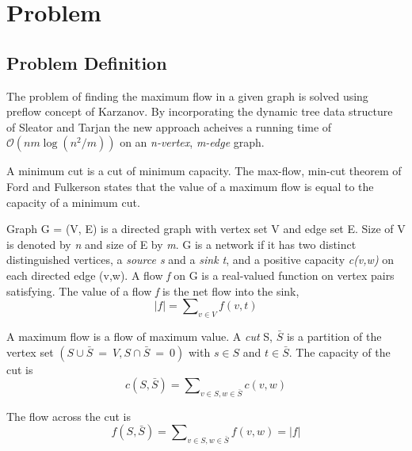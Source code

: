 \section*{Problem}

\subsection*{Problem Definition}
    The problem of finding the maximum flow in a given graph is solved using
    preflow concept of Karzanov. By incorporating the dynamic tree data
    structure~\cite{Sleator:1983:DSD:61337.61338} of Sleator and Tarjan 
    the new approach acheives a running time of $\mathcal{O}(nm\log{(n^2/m)})$ on an 
    \textit{n-vertex}, \textit{m-edge} graph. \newline
    
    A minimum cut is a cut of minimum capacity. The max-flow, min-cut theorem 
    of Ford and Fulkerson states that the value of a maximum flow is equal 
    to the capacity of a minimum cut. \newline

    Graph G = (V, E) is a directed graph with vertex set V and edge set E.
    Size of V is denoted by \textit{n} and size of E by \textit{m}. G is a
    network if it has two distinct distinguished vertices, a \textit{source s}
    and a \textit{sink t}, and a positive capacity \textit{c(v,w)} on each
    directed edge (v,w). A flow \textit{f} on G is a real-valued function on
    vertex pairs satisfying. The value of a flow \textit{f} is the net flow
    into the sink,
    \begin{equation}
    |f| = \sum\nolimits_{v \in V} f(v,t)
    \end{equation}
    \newline

    A maximum flow is a flow of maximum value. A \textit{cut} S, $\bar S$ is a
    partition of the vertex set $( S \cup \bar S\ = \ V, S \cap \bar S \ = \
    0)$ with $ s \in S$ and $t \in \bar S$. The capacity of the cut is
    \begin{equation}
    c(S, \bar S) = \sum\nolimits_{v \in S, w \in \bar S} c(v,w)
    \end{equation}
    \newline
    
    The flow across the cut is
    \begin{equation}
    f(S, \bar S) = \sum\nolimits_{v \in S, w \in \bar S} f(v,w) = |f|
    \end{equation}
    \newline
    

